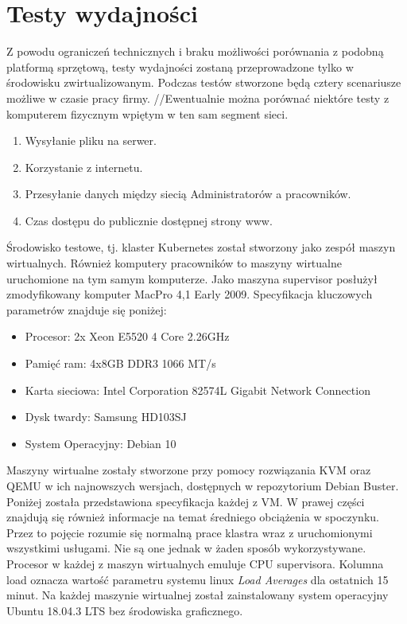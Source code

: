 \documentclass[pl,final,oneside]{mgr} %
\begin{document}
\section{Testy wydajności}
Z powodu ograniczeń technicznych i braku możliwości porównania z podobną platformą sprzętową, testy wydajności zostaną przeprowadzone tylko w środowisku zwirtualizowanym. Podczas testów stworzone będą cztery scenariusze możliwe w czasie pracy firmy.
//Ewentualnie można porównać niektóre testy z komputerem fizycznym wpiętym w ten sam segment sieci.
\begin{enumerate}
	\item Wysyłanie pliku na serwer.
	\item Korzystanie z internetu.
	\item Przesyłanie danych między siecią Administratorów a pracowników.
	\item Czas dostępu do publicznie dostępnej strony www.
\end{enumerate}
Środowisko testowe, tj. klaster Kubernetes został stworzony jako zespół maszyn wirtualnych. Również komputery pracowników to maszyny wirtualne uruchomione na tym samym komputerze. Jako maszyna supervisor posłużył zmodyfikowany komputer MacPro 4,1 Early 2009. Specyfikacja kluczowych parametrów znajduje się poniżej:
\begin{itemize}
	\item Procesor: 2x Xeon E5520 4 Core 2.26GHz
	\item Pamięć ram: 4x8GB DDR3 1066 MT/s
	\item Karta sieciowa: Intel Corporation 82574L Gigabit Network Connection
	\item Dysk twardy: Samsung HD103SJ 
	\item System Operacyjny: Debian 10	
\end{itemize}

Maszyny wirtualne zostały stworzone przy pomocy rozwiązania KVM oraz QEMU w ich najnowszych wersjach, dostępnych w repozytorium Debian Buster. Poniżej została przedstawiona specyfikacja każdej z VM. W prawej części znajdują się również informacje na temat średniego obciążenia w spoczynku. Przez to pojęcie rozumie się normalną prace klastra wraz z uruchomionymi wszystkimi usługami. Nie są one jednak w żaden sposób wykorzystywane. Procesor w każdej z maszyn wirtualnych emuluje CPU supervisora. Kolumna load oznacza wartość parametru systemu linux \textit{Load Averages} dla ostatnich 15 minut. Na każdej maszynie wirtualnej został zainstalowany system operacyjny Ubuntu 18.04.3 LTS bez środowiska graficznego.
\end{document}
